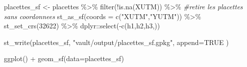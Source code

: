 \documentclass[
  12pt,
  american,
  a4paper,
  extrafontsizes,onecolumn,openright
  ]{memoir}
\newenvironment{Shaded}{\begin{snugshade}}{\end{snugshade}}
\newcommand{\AttributeTok}[1]{\textcolor[rgb]{0.77,0.63,0.00}{#1}}
\newcommand{\CommentTok}[1]{\textcolor[rgb]{0.56,0.35,0.01}{\textit{#1}}}
\newcommand{\ConstantTok}[1]{\textcolor[rgb]{0.00,0.00,0.00}{#1}}
\newcommand{\DecValTok}[1]{\textcolor[rgb]{0.00,0.00,0.81}{#1}}
\newcommand{\FunctionTok}[1]{\textcolor[rgb]{0.00,0.00,0.00}{#1}}
\newcommand{\NormalTok}[1]{#1}
\newcommand{\OtherTok}[1]{\textcolor[rgb]{0.56,0.35,0.01}{#1}}
\newcommand{\SpecialCharTok}[1]{\textcolor[rgb]{0.00,0.00,0.00}{#1}}
\newcommand{\StringTok}[1]{\textcolor[rgb]{0.31,0.60,0.02}{#1}}
\begin{document}
\normalsize

\scriptsize

\begin{Shaded}
\begin{Highlighting}[]
\NormalTok{placettes\_sf }\OtherTok{\textless{}{-}}\NormalTok{ placettes }\SpecialCharTok{\%\textgreater{}\%} 
  \FunctionTok{filter}\NormalTok{(}\SpecialCharTok{!}\FunctionTok{is.na}\NormalTok{(XUTM)) }\SpecialCharTok{\%\textgreater{}\%}  \CommentTok{\#retire les placettes sans coordonnees}
  \FunctionTok{st\_as\_sf}\NormalTok{(}\AttributeTok{coords =} \FunctionTok{c}\NormalTok{(}\StringTok{"XUTM"}\NormalTok{,}\StringTok{"YUTM"}\NormalTok{)) }\SpecialCharTok{\%\textgreater{}\%} 
  \FunctionTok{st\_set\_crs}\NormalTok{(}\DecValTok{32622}\NormalTok{) }\SpecialCharTok{\%\textgreater{}\%} 
\NormalTok{  dplyr}\SpecialCharTok{::}\FunctionTok{select}\NormalTok{(}\SpecialCharTok{{-}}\FunctionTok{c}\NormalTok{(h1,h2,h3,))}

\FunctionTok{st\_write}\NormalTok{(placettes\_sf, }\StringTok{"vault/output/placettes\_sf.gpkg"}\NormalTok{, }\AttributeTok{append=}\ConstantTok{TRUE}\NormalTok{ )}



\FunctionTok{ggplot}\NormalTok{() }\SpecialCharTok{+}
  \FunctionTok{geom\_sf}\NormalTok{(}\AttributeTok{data=}\NormalTok{placettes\_sf)}
\end{Highlighting}
\end{Shaded}

\normalsize

\scriptsize
\end{document}
